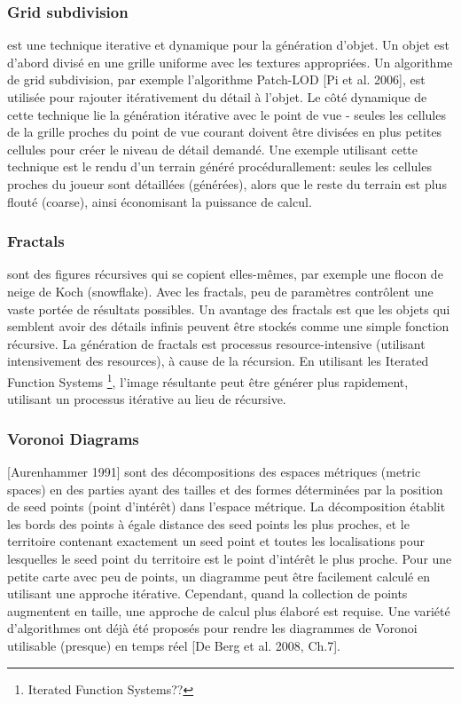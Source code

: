 \documentclass[11pt]{report}
\begin{document}
\subsubsection{Grid subdivision} est une technique iterative et dynamique pour la génération d'objet. Un objet est d'abord divisé en une grille uniforme avec les textures appropriées. Un algorithme de grid subdivision, par exemple l'algorithme Patch-LOD [Pi et al. 2006], est utilisée pour rajouter itérativement du détail à l'objet. Le côté dynamique de cette technique lie la génération itérative avec le point de vue - seules les cellules de la grille proches du point de vue courant doivent être divisées en plus petites cellules pour créer le niveau de détail demandé. Une exemple utilisant cette technique est le rendu d'un terrain généré procédurallement: seules les cellules proches du joueur sont détaillées (générées), alors que le reste du terrain est plus flouté (coarse), ainsi économisant la puissance de calcul.

\subsubsection{Fractals} sont des figures récursives qui se copient elles-mêmes, par exemple une flocon de neige de Koch (snowflake). Avec les fractals, peu de paramètres contrôlent une vaste portée de résultats possibles. Un avantage des fractals est que les objets qui semblent avoir des détails infinis peuvent être stockés comme une simple fonction récursive. La génération de fractals est processus resource-intensive (utilisant intensivement des resources), à cause de la récursion. En utilisant les Iterated Function Systems \footnote{Iterated Function Systems??}, l'image résultante peut être générer plus rapidement, utilisant un processus itérative au lieu de récursive.

\subsubsection{Voronoi Diagrams} [Aurenhammer 1991] sont des décompositions des espaces métriques (metric spaces) en des parties ayant des tailles et des formes déterminées par la position de seed points (point d'intérêt) dans l'espace métrique. La décomposition établit les bords des points à égale distance des seed points les plus proches, et le territoire contenant exactement un seed point et toutes les localisations pour lesquelles le seed point du territoire est le point d'intérêt le plus proche. Pour une petite carte avec peu de points, un diagramme peut être facilement calculé en utilisant une approche itérative. Cependant, quand la collection de points augmentent en taille, une approche de calcul plus élaboré est requise. Une variété d'algorithmes ont déjà été proposés pour rendre les diagrammes de Voronoi utilisable (presque) en temps réel [De Berg et al. 2008, Ch.7].
\end{document}
